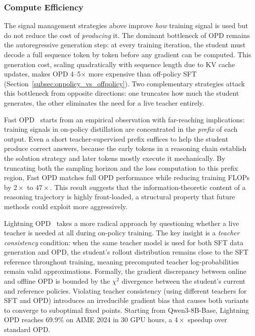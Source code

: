\documentclass{article} %
\begin{document}
\subsubsection{Compute Efficiency}

The signal management strategies above improve \emph{how} training signal is used but do not reduce the cost of \emph{producing} it. The dominant bottleneck of OPD remains the autoregressive generation step: at every training iteration, the student must decode a full sequence token by token before any gradient can be computed. This generation cost, scaling quadratically with sequence length due to KV cache updates, makes OPD 4--5$\times$ more expensive than off-policy SFT (Section~\ref{subsec:onpolicy_vs_offpolicy}). Two complementary strategies attack this bottleneck from opposite directions: one truncates how much the student generates, the other eliminates the need for a live teacher entirely.

Fast OPD~\citep{2602.15260} starts from an empirical observation with far-reaching implications: training signals in on-policy distillation are concentrated in the \emph{prefix} of each output. Even a short teacher-supervised prefix suffices to help the student produce correct answers, because the early tokens in a reasoning chain establish the solution strategy and later tokens mostly execute it mechanically. By truncating both the sampling horizon and the loss computation to this prefix region, Fast OPD matches full OPD performance while reducing training FLOPs by $2\times$ to $47\times$. This result suggests that the information-theoretic content of a reasoning trajectory is highly front-loaded, a structural property that future methods could exploit more aggressively.

Lightning OPD~\citep{wu2026lightning} takes a more radical approach by questioning whether a live teacher is needed at all during on-policy training. The key insight is a \emph{teacher consistency} condition: when the same teacher model is used for both SFT data generation and OPD, the student's rollout distribution remains close to the SFT reference throughout training, meaning precomputed teacher log-probabilities remain valid approximations. Formally, the gradient discrepancy between online and offline OPD is bounded by the $\chi^2$ divergence between the student's current and reference policies. Violating teacher consistency (using different teachers for SFT and OPD) introduces an irreducible gradient bias that causes both variants to converge to suboptimal fixed points. Starting from Qwen3-8B-Base, Lightning OPD reaches 69.9\% on AIME 2024 in 30 GPU hours, a $4\times$ speedup over standard OPD.
\end{document}
